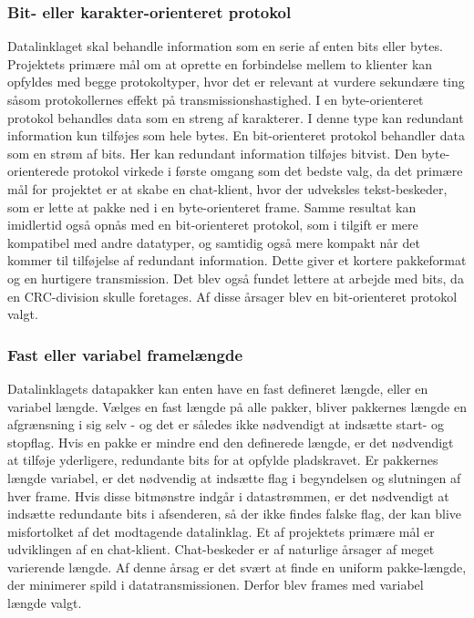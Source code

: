 \subsubsection{Bit- eller karakter-orienteret protokol}
Datalinklaget skal behandle information som en serie af enten bits eller bytes. Projektets primære mål om at oprette en forbindelse mellem to klienter kan opfyldes med begge protokoltyper, hvor det er relevant at vurdere sekundære ting såsom protokollernes effekt på transmissionshastighed.
I en byte-orienteret protokol behandles data som en streng af karakterer. I denne type kan redundant information kun tilføjes som hele bytes.
En bit-orienteret protokol behandler data som en strøm af bits. Her kan redundant information tilføjes bitvist. 
    Den byte-orienterede protokol virkede i første omgang som det bedste valg, da det primære mål for projektet er at skabe en chat-klient, hvor der udveksles tekst-beskeder, som er lette at pakke ned i en byte-orienteret frame. Samme resultat kan imidlertid også opnås med en bit-orienteret protokol, som i tilgift er mere kompatibel med andre datatyper, og samtidig også mere kompakt når det kommer til tilføjelse af redundant information. Dette giver et kortere pakkeformat og en hurtigere transmission. Det blev også fundet lettere at arbejde med bits, da en CRC-division skulle foretages. Af disse årsager blev en bit-orienteret protokol valgt.

\subsubsection{Fast eller variabel framelængde}
Datalinklagets datapakker kan enten have en fast defineret længde, eller en variabel længde.
Vælges en fast længde på alle pakker, bliver pakkernes længde en afgrænsning i sig selv - og det er således ikke nødvendigt at indsætte start- og stopflag. Hvis en pakke er mindre end den definerede længde, er det nødvendigt at tilføje yderligere, redundante bits for at opfylde pladskravet.
Er pakkernes længde variabel, er det nødvendig at indsætte flag i begyndelsen og slutningen af hver frame. Hvis disse bitmønstre indgår i datastrømmen, er det nødvendigt at indsætte redundante bits i afsenderen, så der ikke findes falske flag, der kan blive misfortolket af det modtagende datalinklag.
Et af projektets primære mål er udviklingen af en chat-klient. Chat-beskeder er af naturlige årsager af meget varierende længde. Af denne årsag er det svært at finde en uniform pakke-længde, der minimerer spild i datatransmissionen. Derfor blev frames med variabel længde valgt.

